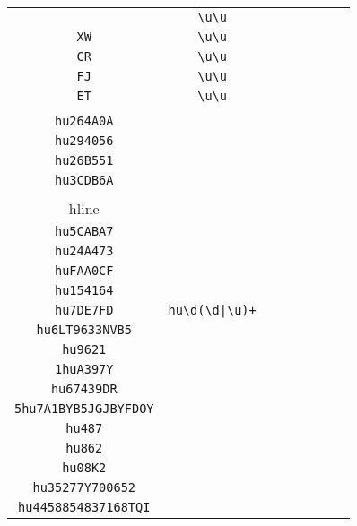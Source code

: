 \begin{longtable}{cccccccc}
\begin{tabular}{ll}
    \verb|OB| & \verb|\u\u|\\
\verb|XW| & \verb|\u\u|\\
\verb|CR| & \verb|\u\u|\\
\verb|FJ| & \verb|\u\u|\\
\verb|ET| & \verb|\u\u|
\end{tabular}
\\\midrule 
\begin{tabular}{l}
    \verb|hu48AC54|\\
\verb|hu264A0A|\\
\verb|hu294056|\\
\verb|hu26B551|\\
\verb|hu3CDB6A|\\
\\hline\\
\verb|hu5CABA7|\\
\verb|hu24A473|\\
\verb|huFAA0CF|\\
\verb|hu154164|\\
\verb|hu7DE7FD|
\end{tabular}

&
\verb.hu\d(\d|\u)+.
&

\begin{tabular}{l}
    \verb|(\d)*hu(\d)*(\u)*(\d)*\d(\u)*\d(\u)*|\\
\verb|hu6LT9633NVB5|\\
\verb|hu9621|\\
\verb|1huA397Y|\\
\verb|hu67439DR|\\
\verb|5hu7A1BYB5JGJBYFDOY|
\end{tabular}

&

\begin{tabular}{l}
    \verb|hu((\d)*\d)*\d(\u)*\d(\u)*(\d)*|\\
\verb|hu487|\\
\verb|hu862|\\
\verb|hu08K2|\\
\verb|hu35277Y700652|\\
\verb|hu4458854837168TQI|
\end{tabular}

&


\end{longtable}

